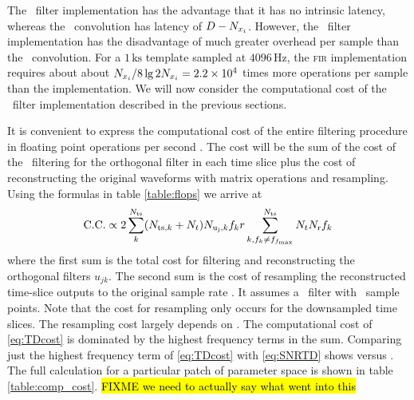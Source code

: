 The \fir\ filter implementation has the advantage that it has no intrinsic
latency, whereas the \fft\ convolution has latency of $D-N_{x_i}$. 
%
%
%
However, the \fir\ filter implementation has the disadvantage of much greater
overhead per sample than the \fft\ convolution.  For a $1\,\mathrm{ks}$
template sampled at $4096\,\mathrm{Hz}$, the \textsc{fir} implementation
requires about about $N_{x_i} / 8 \lg 2 N_{x_i} = 2.2 \times 10^4$ times
more operations per sample than the \fft{} implementation.  We will now consider
the computational cost of the \fir\ filter implementation described in the
previous sections.

It is convenient to express the computational cost of the entire filtering
procedure in floating point operations per second {\flops}.  The cost will be
the sum of the cost of the \fir\ filtering for the orthogonal filter in each
time slice plus the cost of reconstructing the original waveforms with matrix
operations and resampling.  Using the formulas in table \ref{table:flops} we
arrive at
%
\begin{equation}
\mathrm{C.C.} \propto 2 \sum_k^{{N}_{\mathrm{ts}}} (N_{\mathrm{ts},k} + N_t) N_{\mathrm{u_j},k} f_k \nonumber
	r \sum_{k, f_k \neq f_{f_{\mathrm{max}}}}^{{N}_{\mathrm{ts}}} N_t N_{\mathrm{r}} f_k 
\label{eq:TDcost}
\end{equation}
%
where the first sum is the total cost for filtering and reconstructing the
orthogonal filters $u_{jk}$.  The second sum is the cost of resampling the
reconstructed time-slice outputs to the original sample rate {\fmax}.  It
assumes a \fir\ filter with \resampsamps\ sample points.  Note that the cost
for resampling only occurs for the downsampled time slices. The resampling cost
largely depends on {\resampsamps}.  The computational cost of \eqref{eq:TDcost}
is dominated by the highest frequency terms in the sum.  Comparing just the
highest frequency term of \eqref{eq:TDcost} with \eqref{eq:SNRTD} shows  \flops{}
versus \order{\numtmps \tmpsamps \fmax} {\flops}.  The full calculation for a
particular patch of parameter space is shown in table \ref{table:comp_cost}.
\hl{FIXME we need to actually say what went into this} 




